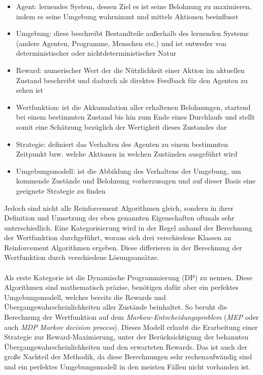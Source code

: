 \begin{itemize}
    \item Agent: lernendes System, dessen Ziel es ist seine Belohnung zu maximieren, indem es seine Umgebung wahrnimmt und mittels Aktionen beeinflusst
    \item Umgebung: diese beschreibt Bestandteile außerhalb des lernenden Systems (andere Agenten, Programme, Menschen etc.) und ist entweder von deterministischer oder nichtdeterministischer Natur
    \item Reward: numerischer Wert der die Nützlichkeit einer Aktion im aktuellen Zustand beschreibt und dadurch als direktes Feedback für den Agenten zu sehen ist
    \item Wertfunktion: ist die Akkumulation aller erhaltenen Belohnungen, startend bei einem bestimmten Zustand bis hin zum Ende eines Durchlaufs und stellt somit eine Schätzung bezüglich der Wertigkeit dieses Zustandes dar
    \item Strategie: definiert das Verhalten des Agenten zu einem bestimmten Zeitpunkt bzw. welche Aktionen in welchen Zuständen ausgeführt wird
    \item Umgebungsmodell: ist die Abbildung des Verhaltens der Umgebung, um kommende Zustände und Belohnung vorherzusagen und auf dieser Basis eine geeignete Strategie zu finden
\end{itemize}
Jedoch sind nicht alle Reinforcement Algorithmen gleich, sondern in ihrer Definition und Umsetzung der eben genannten Eigenschaften oftmals sehr unterschiedlich. Eine Kategorisierung wird in der Regel anhand der Berechnung der Wertfunktion durchgeführt, woraus sich drei verschiedene Klassen an Reinforcement Algorithmen ergeben. Diese differieren in der Berechnung der Wertfunktion durch verschiedene Lösungsansätze.\\\\
\newpage
Als erste Kategorie ist die Dynamische Programmierung (DP) zu nennen.
Diese Algorithmen sind mathematisch präzise, benötigen dafür aber ein perfektes Umgebungsmodell, welches bereits die Rewards und Übergangswahrscheinlichkeiten aller Zustände beinhaltet. So beruht die Berechnung der Wertfunktion auf dem \textit{Markow-Entscheidungsproblem} (\textit{MEP} oder auch \textit{MDP} \textit{Markov decision process}). Dieses Modell erlaubt die Erarbeitung einer Strategie zur Reward-Maximierung, unter der Berücksichtigung der bekannten Übergangswahrscheinlichkeiten und den erwarteten Rewards. 
Das ist auch der große Nachteil der Methodik, da diese Berechnungen sehr rechenaufwändig sind und ein perfektes Umgebungsmodell in den meisten Fällen nicht vorhanden ist.\\\\
